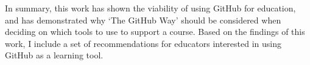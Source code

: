 In summary, this work has shown the viability of using GitHub for education, and has demonstrated why `The GitHub Way' should be considered when deciding on which tools to use to support a course. Based on the findings of this work, I include a set of recommendations for educators interested in using GitHub as a learning tool.



